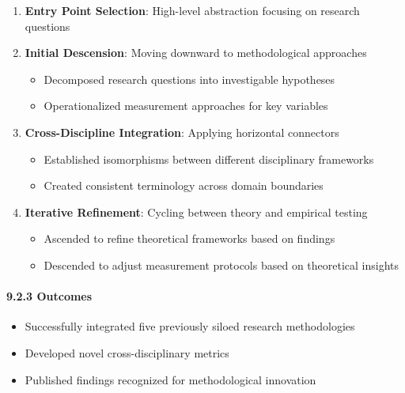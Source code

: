 \documentclass[
]{article}
\providecommand{\tightlist}{%
  \setlength{\itemsep}{0pt}\setlength{\parskip}{0pt}}
\begin{document}
\begin{enumerate}
\def\labelenumi{\arabic{enumi}.}
\tightlist
\item
  \textbf{Entry Point Selection}: High-level abstraction focusing on
  research questions
\item
  \textbf{Initial Descension}: Moving downward to methodological
  approaches

  \begin{itemize}
  \tightlist
  \item
    Decomposed research questions into investigable hypotheses
  \item
    Operationalized measurement approaches for key variables
  \end{itemize}
\item
  \textbf{Cross-Discipline Integration}: Applying horizontal connectors

  \begin{itemize}
  \tightlist
  \item
    Established isomorphisms between different disciplinary frameworks
  \item
    Created consistent terminology across domain boundaries
  \end{itemize}
\item
  \textbf{Iterative Refinement}: Cycling between theory and empirical
  testing

  \begin{itemize}
  \tightlist
  \item
    Ascended to refine theoretical frameworks based on findings
  \item
    Descended to adjust measurement protocols based on theoretical
    insights
  \end{itemize}
\end{enumerate}

\paragraph{9.2.3 Outcomes}\label{outcomes-1}

\begin{itemize}
\tightlist
\item
  Successfully integrated five previously siloed research methodologies
\item
  Developed novel cross-disciplinary metrics
\item
  Published findings recognized for methodological innovation
\end{itemize}
\end{document}
